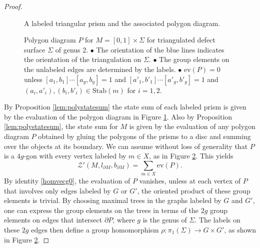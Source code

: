 \documentclass[1.5pt, a4paper]{article}
\newcommand{\arrowIn}{
\tikz \draw[-stealth, line width=1pt] (-1pt,0) -- (1pt,0);
}
\begin{document}
\begin{proof}
\begin{figure}
\begin{center}
\end{center}
\caption{A labeled triangular prism and the  associated polygon diagram.}
\label{eq:prism}
\end{figure}


\begin{figure}
\begin{center}
\def\svgwidth{.75\columnwidth}
 
\end{center}
\caption{Polygon diagram $P$ for $M=[0,1]\times\Sigma$ for triangulated defect surface $\Sigma$ of genus 2. \newline
$\bullet$ The orientation of the blue lines indicates the orientation of the triangulation on $\Sigma$. \newline
$\bullet$ The group elements on the unlabeled edges are determined by the labels.\newline 
$\bullet$ $\mathrm{ev}(P)=0$ unless $[a_1, b_1]\cdots [a_g, b_g]=1$ and $[a'_1,b'_1]\cdots [a'_g,b'_g]=1$ and $(a_i,a'_i), (b_i, b'_i)\in \mathrm{Stab}(m)$ for $i=1,2$.}
\label{fig:polygonsurface}
\end{figure}

By Proposition \ref{lem:polystatesum} the state sum of each labeled  prism is given by the evaluation of  the  polygon diagram in Figure \ref{eq:prism}. Also by Proposition \ref{lem:polystatesum}, the state sum for $M$ is given by the evaluation of any polygon diagram $P$ obtained by  gluing the polygons of the prisms to a disc and summing over the objects at its boundary. We can assume without loss of generality that $P$  is a $4g$-gon with every vertex labeled by  $m\in X$, as in Figure \ref{fig:polygonsurface}. This yields
$$\mathcal Z'(M, l_{\partial M},b_{\partial M})=\sum_{m\in X} \mathrm{ev}(P).$$
By identity \eqref{homvecg0},  the evaluation of $P$ vanishes, unless at each  vertex of $P$ that involves only edges labeled by $G$ or $G'$,  the oriented product of these group elements  is trivial.  By choosing maximal trees in the graphs labeled by $G$ and $G'$, one can express the group elements on the trees in terms of the  $2g$ group elements on edges that intersect $\partial P$, where $g$ is the genus of $\Sigma$. The labels on these $2g$ edges  then define
 a group homomorphism $\rho: \pi_1(\Sigma)\to G\times G'$, as shown in Figure \ref{fig:polygonsurface}.



\end{proof}
\end{document}
